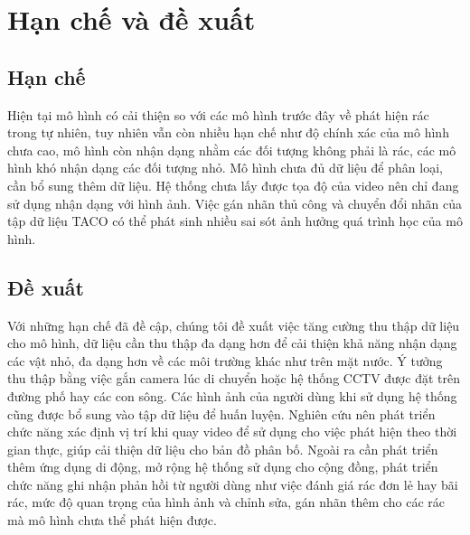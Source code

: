 \documentclass[../the.tex]{subfiles}
\begin{document}
\section{Hạn chế và đề xuất}
\subsection{Hạn chế}
{\fontsize{13}{12} \selectfont
Hiện tại mô hình có cải thiện so với các mô hình trước đây về phát hiện rác trong tự nhiên, tuy nhiên vẫn còn nhiều hạn chế như độ chính xác của mô hình chưa cao, mô hình còn nhận dạng nhằm các đối tượng không phải là rác, các mô hình khó nhận dạng các đối tượng nhỏ. Mô hình chưa đủ dữ liệu để phân loại, cần bổ sung thêm dữ liệu. Hệ thống chưa lấy được tọa độ của video nên chỉ đang sử dụng nhận dạng với hình ảnh. Việc gán nhãn thủ công và chuyển đổi nhãn của tập dữ liệu TACO có thể phát sinh nhiều sai sót ảnh hưởng quá trình học của mô hình.	

}
\subsection{Đề xuất}
{\fontsize{13}{12} \selectfont 
Với những hạn chế đã đề cập, chúng tôi đề xuất việc tăng cường thu thập dữ liệu cho mô hình, dữ liệu cần thu thập đa dạng hơn để cải thiện khả năng nhận dạng các vật nhỏ, đa dạng hơn về các môi trường khác như trên mặt nước. Ý tưởng 
thu thập bằng việc gắn camera lúc di chuyển hoặc hệ thống CCTV được đặt trên đường phố hay các con sông.
Các hình ảnh của người dùng khi sử dụng hệ thống cũng được bổ sung vào tập dữ liệu để huấn luyện. 
Nghiên cứu nên phát triển chức năng xác định vị trí khi quay video để sử dụng cho việc phát hiện theo thời gian thực, giúp cải thiện dữ liệu cho bản đồ phân bố.
Ngoài ra cần phát triển thêm ứng dụng di động, mở rộng hệ thống sử dụng cho cộng đồng, phát triển chức năng ghi nhận phản hồi từ người dùng như việc đánh giá rác đơn lẻ hay bãi rác, mức độ quan trọng của hình ảnh và chỉnh sửa, gán nhãn thêm cho các rác mà mô hình chưa thể phát hiện được.
}
\end{document}
